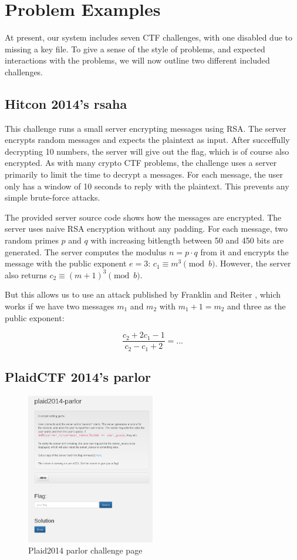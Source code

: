 \section{Problem Examples}
At present, our system includes seven CTF challenges, with one
disabled due to missing a key file. To give a sense of the style of
problems, and expected interactions with the problems, we will now
outline two different included challenges.

\subsection{Hitcon 2014's rsaha}
This challenge runs a small server encrypting messages using RSA. The
server encrypts random messages and expects the plaintext as
input. After succeffully decrypting 10 numbers, the server will give
out the flag, which is of course also encrypted. As with many crypto
CTF problems, the challenge uses a server primarily to limit the time
to decrypt a messages. For each message, the user only has a window of
10 seconds to reply with the plaintext. This prevents any simple
brute-force attacks.

The provided server source code shows how the messages are
encrypted. The server uses naive RSA encryption without any
padding. For each message, two random primes $p$ and $q$ with
increasing bitlength between 50 and 450 bits are generated. The server
computes the modulus $n=p\cdot q$ from it and encrypts the message
with the public exponent $e=3$: $c_1\equiv m^3 \pmod{b}$. However, the
server also returns $c_2\equiv (m+1)^3\pmod{b}$.

But this allows us to use an attack published by Franklin and Reiter
\cite{franklin1995linear}, which works if we have two messages $m_1$
and $m_2$ with $m_1 +1 = m_2$ and three as the public exponent:

\[ \frac{c_2+2c_1-1}{c_2-c_1+2} = \ldots \]

\subsection{PlaidCTF 2014's parlor}

\begin{figure}[!ht]
\centering
\includegraphics[width=0.5\textwidth]{parlor_page.png}
\caption{Plaid2014 parlor challenge page}\label{fig:parlor_page}
\end{figure}

